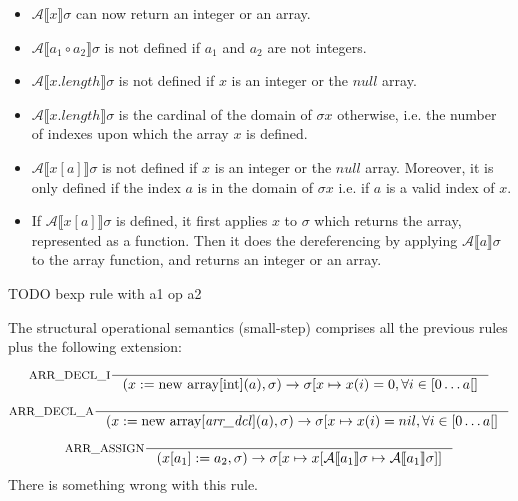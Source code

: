 \documentclass{article}
\begin{document}
\begin{itemize}
\item \(\mathcal{A}\llbracket x \rrbracket \sigma \) can now return an integer or an array.
\item \(\mathcal{A}\llbracket a_1 \circ a_2 \rrbracket \sigma \) is not defined if \(a_1\) and \(a_2\) are not integers.
\item \(\mathcal{A}\llbracket x.length \rrbracket \sigma \) is not defined if \(x\) is an integer or the \(null\) array.
\item \(\mathcal{A}\llbracket x.length \rrbracket \sigma \) is the cardinal of the domain of \(\sigma x\) otherwise, i.e. the number of indexes upon which the array \(x\) is defined.
\item \(\mathcal{A}\llbracket x[a] \rrbracket \sigma \) is not defined if \(x\) is an integer or the \(null\) array. Moreover, it is only defined if the index \(a\) is in the domain of \(\sigma x\) i.e. if \(a\) is a valid index of \(x\).
\item If \(\mathcal{A}\llbracket x[a] \rrbracket \sigma \) is defined, it first applies \(x\) to \(\sigma\) which returns the array, represented as a function. Then it does the dereferencing by applying \(\mathcal{A}\llbracket a \rrbracket \sigma\) to the array function, and returns an integer or an array.
\end{itemize}

TODO bexp rule with a1 op a2

The structural operational semantics (small-step) comprises all the previous rules plus the following extension:
% 

\[
\inference[ARR\_DECL\_I]{}{(x := \text{new array[int]}(a), \sigma) \rightarrow
      \sigma[x \mapsto x(i) = 0, \forall i \in [0 \dots a[ ]}
\]

\[
\inference[ARR\_DECL\_A]{}{(x := \text{new array[} \text{\textit{arr\_dcl}]}(a), \sigma) \rightarrow
      \sigma[x \mapsto x(i) = nil, \forall i \in [0 \dots a[ ]}
\]


\[
\inference[ARR\_ASSIGN]{}
    {(x[a_1] := a_2, \sigma) \rightarrow
     \sigma[x \mapsto x[\mathcal{A}\llbracket a_1 \rrbracket \sigma \mapsto \mathcal{A}\llbracket a_1 \rrbracket \sigma]]}
\]
There is something wrong with this rule.
\end{document}
